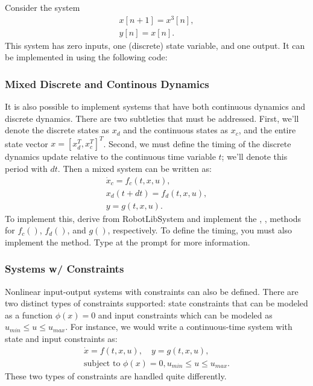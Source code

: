\begin{example}
Consider the system \begin{gather*}x[n+1] = x^3[n],\\ y[n] = x[n].\end{gather*}  This system has zero inputs, one (discrete) state variable, and one output.  It can be implemented in \robotlib using the following code:

\end{example}


\subsubsection{Mixed Discrete and Continous Dynamics}

It is also possible to implement systems that have both continuous dynamics and discrete dynamics.   There are two subtleties that must be addressed.  First, we'll denote the discrete states as $x_d$ and the continuous states as $x_c$, and the entire state vector $x = [x_d^T, x_c^T]^T$.   Second, we must define the timing of the discrete dynamics update relative to the continuous time variable $t$; we'll denote this period with $dt$.  Then a mixed system can be written as:\begin{gather*} \dot{x}_c = f_c(t,x,u),\\ x_d(t+dt) = f_d(t,x,u),\\ y=g(t,x,u). \end{gather*}
To implement this, derive from RobotLibSystem and implement the , ,  methods for $f_c()$, $f_d()$, and $g()$, respectively.  To define the timing, you must also implement the  method.  Type  at the \matlab prompt for more information.  


\subsubsection{Systems w/ Constraints}

Nonlinear input-output systems with constraints can
also be defined.  There are two distinct types of constraints supported: state constraints that can be modeled as a function $\phi(x) = 0$ and input constraints which can be modeled as $u_{min} \le u \le u_{max}$.  For instance, we would write a continuous-time system with state and input constraints as:
\begin{gather*}
\dot{x} = f(t,x,u),\quad y = g(t,x,u), \\ \text{subject to }  \phi(x) =
0, u_{min} \le u \le u_{max}.
\end{gather*}
These two types of constraints are handled quite differently.  


